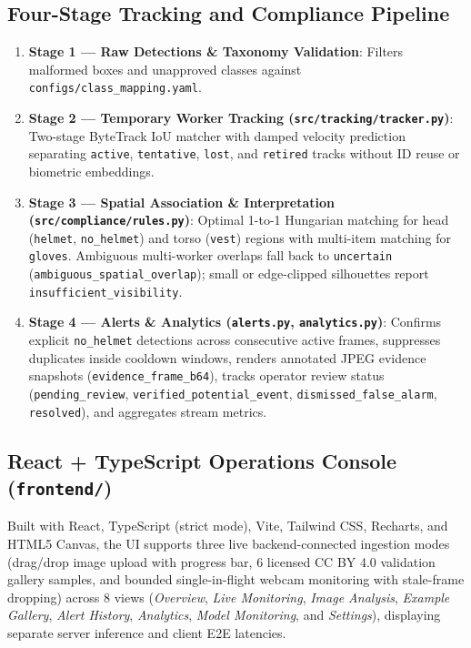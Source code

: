 \documentclass[11pt,a4paper]{article}
\begin{document}
\subsection{Four-Stage Tracking and Compliance Pipeline}
\begin{enumerate}
  \item \textbf{Stage 1 --- Raw Detections \& Taxonomy Validation}: Filters malformed boxes and unapproved classes against \texttt{configs/class\_mapping.yaml}.
  \item \textbf{Stage 2 --- Temporary Worker Tracking (\texttt{src/tracking/tracker.py})}: Two-stage ByteTrack IoU matcher with damped velocity prediction separating \texttt{active}, \texttt{tentative}, \texttt{lost}, and \texttt{retired} tracks without ID reuse or biometric embeddings.
  \item \textbf{Stage 3 --- Spatial Association \& Interpretation (\texttt{src/compliance/rules.py})}: Optimal 1-to-1 Hungarian matching for head (\texttt{helmet}, \texttt{no\_helmet}) and torso (\texttt{vest}) regions with multi-item matching for \texttt{gloves}. Ambiguous multi-worker overlaps fall back to \texttt{uncertain} (\texttt{ambiguous\_spatial\_overlap}); small or edge-clipped silhouettes report \texttt{insufficient\_visibility}.
  \item \textbf{Stage 4 --- Alerts \& Analytics (\texttt{alerts.py}, \texttt{analytics.py})}: Confirms explicit \texttt{no\_helmet} detections across consecutive active frames, suppresses duplicates inside cooldown windows, renders annotated JPEG evidence snapshots (\texttt{evidence\_frame\_b64}), tracks operator review status (\texttt{pending\_review}, \texttt{verified\_potential\_event}, \texttt{dismissed\_false\_alarm}, \texttt{resolved}), and aggregates stream metrics.
\end{enumerate}

\subsection{React + TypeScript Operations Console (\texttt{frontend/})}
Built with React, TypeScript (strict mode), Vite, Tailwind CSS, Recharts, and HTML5 Canvas, the UI supports three live backend-connected ingestion modes (drag/drop image upload with progress bar, 6 licensed CC BY 4.0 validation gallery samples, and bounded single-in-flight webcam monitoring with stale-frame dropping) across 8 views (\emph{Overview}, \emph{Live Monitoring}, \emph{Image Analysis}, \emph{Example Gallery}, \emph{Alert History}, \emph{Analytics}, \emph{Model Monitoring}, and \emph{Settings}), displaying separate server inference and client E2E latencies.
\end{document}
